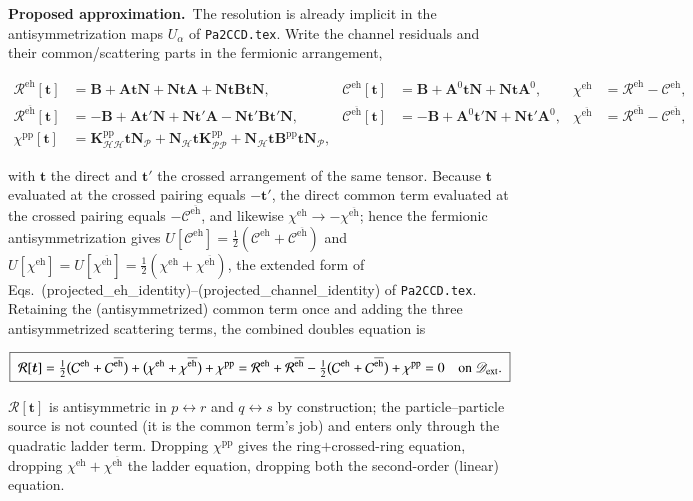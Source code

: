 \documentclass[aip,jcp,reprint,noshowkeys,superscriptaddress]{revtex4-1}
\newcommand{\bA}{\boldsymbol{A}}
\newcommand{\bB}{\boldsymbol{B}}
\newcommand{\bN}{\boldsymbol{N}}
\newcommand{\eh}{\text{eh}}
\newcommand{\teh}{\overline{\text{eh}}}
\newcommand{\pp}{\text{pp}}
\newcommand{\Proposed}{\textbf{Proposed approximation.}\ }
\newcommand{\bt}{\boldsymbol{t}}
\newcommand{\bK}{\boldsymbol{K}}
\begin{document}
\Proposed The resolution is already implicit in the antisymmetrization maps
$U_\alpha$ of \texttt{Pa2CCD.tex}.  Write the channel residuals and their
common/scattering parts in the fermionic arrangement,
\begin{widetext}
\begin{align}
  \mathcal R^{\eh}[\bt]&=\bB+\bA\bt\bN+\bN\bt\bA+\bN\bt\bB\bt\bN ,
  &\mathcal C^{\eh}[\bt]&=\bB+\bA^{0}\bt\bN+\bN\bt\bA^{0},
  &\chi^{\eh}&=\mathcal R^{\eh}-\mathcal C^{\eh},
  \nonumber\\
  \mathcal R^{\teh}[\bt]&=-\bB+\bA\bt'\bN+\bN\bt'\bA-\bN\bt'\bB\bt'\bN ,
  &\mathcal C^{\teh}[\bt]&=-\bB+\bA^{0}\bt'\bN+\bN\bt'\bA^{0},
  &\chi^{\teh}&=\mathcal R^{\teh}-\mathcal C^{\teh},
  \nonumber\\
  \chi^{\pp}[\bt]&=\bK^{\pp}_{\mathcal{HH}}\bt\bN_{\mathcal P}+\bN_{\mathcal H}\bt\bK^{\pp}_{\mathcal{PP}}+\bN_{\mathcal H}\bt\bB^{\pp}\bt\bN_{\mathcal P},
  \label{eq:pieces}
\end{align}
\end{widetext}
with $\bt$ the direct and $\bt'$ the crossed arrangement of the same tensor.
Because $\bt$ evaluated at the crossed pairing equals $-\bt'$, the direct
common term evaluated at the crossed pairing equals $-\mathcal C^{\teh}$, and
likewise $\chi^{\eh}\to-\chi^{\teh}$; hence the fermionic antisymmetrization
gives $U[\mathcal C^{\eh}]=\tfrac12(\mathcal C^{\eh}+\mathcal C^{\teh})$ and
$U[\chi^{\eh}]=U[\chi^{\teh}]=\tfrac12(\chi^{\eh}+\chi^{\teh})$, the extended
form of Eqs.~(projected\_eh\_identity)--(projected\_channel\_identity) of
\texttt{Pa2CCD.tex}.  Retaining the (antisymmetrized) common term once and
adding the three antisymmetrized scattering terms, the combined doubles
equation is
\begin{widetext}
\begin{equation}
  \boxed{\;
  \mathcal R[\bt]=\tfrac12\bigl(\mathcal C^{\eh}+\mathcal C^{\teh}\bigr)
  +\bigl(\chi^{\eh}+\chi^{\teh}\bigr)+\chi^{\pp}
  =\mathcal R^{\eh}+\mathcal R^{\teh}-\tfrac12\bigl(\mathcal C^{\eh}+\mathcal C^{\teh}\bigr)+\chi^{\pp}=0
  \quad\text{on }\mathscr D_{\rm ext}.\;}
  \label{eq:combined}
\end{equation}
\end{widetext}
$\mathcal R[\bt]$ is antisymmetric in $p\leftrightarrow r$ and
$q\leftrightarrow s$ by construction; the particle--particle source is not
counted (it is the common term's job) and enters only through the quadratic
ladder term.  Dropping $\chi^{\pp}$ gives the ring$+$crossed-ring equation,
dropping $\chi^{\eh}+\chi^{\teh}$ the ladder equation, dropping both the
second-order (linear) equation.
\end{document}
